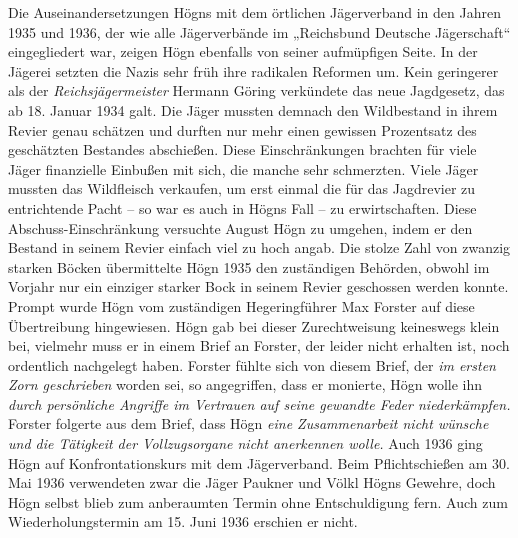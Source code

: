 \documentclass{book}
\begin{document}
Die Auseinandersetzungen Högns mit dem örtlichen Jägerverband in den
Jahren 1935 und 1936, der wie alle Jägerverbände im „Reichsbund
Deutsche Jägerschaft“ eingegliedert war, zeigen Högn ebenfalls von
seiner aufmüpfigen Seite. In der Jägerei setzten die Nazis sehr früh
ihre radikalen Reformen um. Kein geringerer als der
\textit{Reichsjägermeister} Hermann Göring verkündete das neue
Jagdgesetz, das ab 18. Januar 1934 galt. Die Jäger mussten demnach den
Wild\-bestand in ihrem Revier genau schätzen und durften nur mehr einen
gewissen Prozentsatz des geschätzten Bestandes abschießen. Diese
Einschränkungen brachten für viele Jäger finanzielle Einbußen mit sich,
die manche sehr schmerzten. Viele Jäger mussten das Wildfleisch
verkaufen, um erst einmal die für das Jagdrevier zu entrichtende Pacht
– so war es auch in Högns Fall – zu erwirtschaften. Diese
Abschuss-Einschränkung versuchte August Högn zu umgehen, indem er den
Bestand in seinem Revier einfach viel zu hoch angab. Die stolze Zahl
von zwanzig starken Böcken übermittelte Högn 1935 den zu\-ständigen
Behörden, obwohl im Vorjahr nur ein einziger starker Bock in sei\-nem
Revier geschossen werden konnte. Prompt wurde Högn vom zustän\-digen
Hegeringführer Max Forster auf diese Übertreibung hingewiesen. Högn gab
bei dieser Zurechtweisung keineswegs klein bei, vielmehr muss er in
einem Brief an Forster, der leider nicht erhalten ist, noch ordentlich
nachge\-legt haben. Forster fühlte sich von diesem Brief, der
\textit{im ersten Zorn geschrieben} worden sei, so angegriffen, dass er
monierte, Högn wolle ihn \textit{durch persönliche Angriffe im
Vertrauen auf seine gewandte Feder niederkämpfen.} Forster folgerte aus
dem Brief, dass Högn \textit{eine Zusammenarbeit nicht wünsche und die
Tätigkeit der Vollzugsorgane nicht anerkennen wolle.} Auch 1936 ging
Högn auf Konfrontationskurs mit dem Jägerverband. Beim Pflichtschießen
am 30. Mai 1936 verwendeten zwar die Jäger Paukner und Völkl Högns
Gewehre, doch Högn selbst blieb zum anberaumten Termin ohne
Entschuldigung fern. Auch zum Wiederholungstermin am 15. Juni 1936
erschien er nicht.



\end{document}
